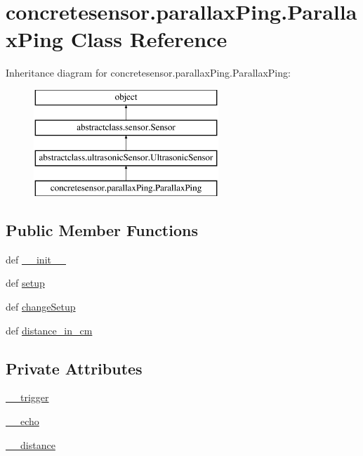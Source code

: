 \hypertarget{classconcretesensor_1_1parallaxPing_1_1ParallaxPing}{}\section{concretesensor.\+parallax\+Ping.\+Parallax\+Ping Class Reference}
\label{classconcretesensor_1_1parallaxPing_1_1ParallaxPing}
Inheritance diagram for concretesensor.\+parallax\+Ping.\+Parallax\+Ping\+:\begin{figure}[H]
\begin{center}
\leavevmode
\includegraphics[height=4.000000cm]{classconcretesensor_1_1parallaxPing_1_1ParallaxPing}
\end{center}
\end{figure}
\subsection*{Public Member Functions}
\begin{DoxyCompactItemize}
\item 
def \hyperlink{classconcretesensor_1_1parallaxPing_1_1ParallaxPing_aea2e8dc6e3162d61be24e8a1c52a1b72}{\+\_\+\+\_\+init\+\_\+\+\_\+}
\item 
def \hyperlink{classconcretesensor_1_1parallaxPing_1_1ParallaxPing_a647dbebfb7714f73ac032e301e405420}{setup}
\item 
def \hyperlink{classconcretesensor_1_1parallaxPing_1_1ParallaxPing_ab4fe1782430822a6120b2000dd5b04c9}{change\+Setup}
\item 
def \hyperlink{classconcretesensor_1_1parallaxPing_1_1ParallaxPing_a82ad488e8ccb94073dbe89215a45d51b}{distance\+\_\+in\+\_\+cm}
\end{DoxyCompactItemize}
\subsection*{Private Attributes}
\begin{DoxyCompactItemize}
\item 
\hyperlink{classconcretesensor_1_1parallaxPing_1_1ParallaxPing_afd7e7471c9f0a04033405c211e4deb39}{\+\_\+\+\_\+trigger}
\item 
\hyperlink{classconcretesensor_1_1parallaxPing_1_1ParallaxPing_afcd12b690282999746879b0636274b3e}{\+\_\+\+\_\+echo}
\item 
\hyperlink{classconcretesensor_1_1parallaxPing_1_1ParallaxPing_aa5c1c0591e763f4d570976feb6ce7f47}{\+\_\+\+\_\+distance}
\end{DoxyCompactItemize}



